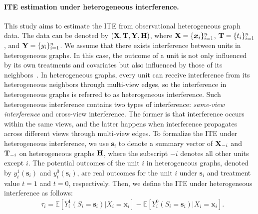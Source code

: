 \documentclass[runningheads]{llncs}
\begin{document}
\paragraph{ITE estimation under heterogeneous interference.} This study aims to estimate the ITE from observational heterogeneous graph data. The data can be denoted by $(\bold{X},\bold{T},\bold{Y},\bold{H})$, where $\bold{X}=\{\boldsymbol{x}_i\}^n_{i=1}$, $\bold{T}=\{t_i\}^n_{i=1}$, and $\bold{Y}=\{y_i\}^n_{i=1}$. We assume that there exists interference between units in heterogeneous graphs. In this case,  the outcome of a unit is not only influenced by its own treatments and covariates but also influenced by those of its neighbors~\cite{pmlr-v130-ma21c,rakesh2018linked}. 
In heterogeneous graphs, every unit can receive interference from its heterogeneous neighbors through multi-view edges, so the interference in heterogeneous graphs is referred to as heterogeneous interference. Such  heterogeneous interference contains two types of interference: \emph{same-view interference} and cross-view interference. The former is that interference occurs within the same views, and the latter happens when interference propagates across different views through   multi-view edges. 
To formalize the ITE under heterogeneous interference, we use $\boldsymbol{s}_i$ to denote a summary vector of $\bold{X}_{-i}$ and $\bold{T}_{-i}$ on heterogeneous graphs $\bold{H}$, where the subscript $-i$ denotes all other units except $i$. The potential outcomes of the unit $i$  in heterogeneous graphs, denoted by $y^1_i(\boldsymbol{s}_i)$ and $y^0_i(\boldsymbol{s}_i)$,  are real outcomes for the unit $i$ under  $\boldsymbol{s}_i$ and treatment value $t=1$ and $t = 0$, respectively.
Then, we define the ITE under heterogeneous interference as follows:
\begin{equation}\label{ite:spillover}
\begin{aligned}
&\tau_i=\mathbb{E}[Y_i^{1}(S_i=\boldsymbol{s}_i)\vert X_i=\boldsymbol{x}_i]-\mathbb{E}[Y_i^{0}(S_i=\boldsymbol{s}_i)\vert X_i=\boldsymbol{x}_i].
\end{aligned}
\end{equation}
\end{document}
